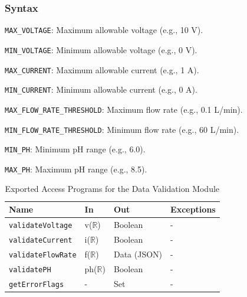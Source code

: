 \documentclass[12pt, titlepage]{article}
\begin{document}
\subsubsection{Syntax}
\begin{description}
  \item[Exported Constants and Access Programs:]
  \item 
  \texttt{MAX\_VOLTAGE}: Maximum allowable voltage (e.g., 10 V).
  \item
  \texttt{MIN\_VOLTAGE}: Minimum allowable voltage (e.g., 0 V).
  \item
  \texttt{MAX\_CURRENT}: Maximum allowable current (e.g., 1 A).
  \item
  \texttt{MIN\_CURRENT}: Minimum allowable current (e.g., 0 A).
  \item
  \texttt{MAX\_FLOW\_RATE\_THRESHOLD}: Maximum flow rate (e.g., 0.1 L/min).
  \item
  \texttt{MIN\_FLOW\_RATE\_THRESHOLD}: Minimum flow rate (e.g., 60 L/min).
  \item
  \texttt{MIN\_PH}: Minimum pH range (e.g., 6.0).
  \item
  \texttt{MAX\_PH}: Maximum pH range (e.g., 8.5).

  \begin{table}[H]
    \centering
    \begin{tabular}{p{} p{} p{} p{}}
    \toprule
    \textbf{Name} & \textbf{In} & \textbf{Out} & \textbf{Exceptions}\\
    \midrule
    
    \texttt{validateVoltage} & v($\mathbb{R}$) & Boolean & - \\
    \midrule
    
    \texttt{validateCurrent} & i($\mathbb{R}$) & Boolean & - \\
    \midrule

    \texttt{validateFlowRate} & f($\mathbb{R}$) & Data (JSON) & - \\
    \midrule

    \texttt{validatePH} & ph($\mathbb{R}$) & Boolean & - \\

    \midrule
    
    \texttt{getErrorFlags} & - & Set & - \\
    \bottomrule
    
    \end{tabular}
    \caption{Exported Access Programs for the Data Validation Module}
    \label{TblEAP_Validation}
  \end{table}
\end{description}
\end{document}
